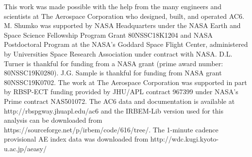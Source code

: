 \documentclass[draft]{agujournal2019}
\begin{document}
\acknowledgments
This work was made possible with the help from the many engineers and scientists at The Aerospace Corporation who designed, built, and operated AC6. M. Shumko was supported by NASA Headquarters under the NASA Earth and Space Science Fellowship Program Grant 80NSSC18K1204 and NASA Postdoctoral Program at the NASA's Goddard Space Flight Center, administered by Universities Space Research Association under contract with NASA. D.L. Turner is thankful for funding from a NASA grant (prime award number: 80NSSC19K0280). J.G. Sample is thankful for funding from NASA grant 80NSSC19K0702. The work at The Aerospace Corporation was supported in part by RBSP-ECT funding provided by JHU/APL contract 967399 under NASA's Prime contract NAS501072. The AC6 data and documentation is available at http://rbspgway.jhuapl.edu/ac6 and the IRBEM-Lib version used for this analysis can be downloaded from \\ \noindent https://sourceforge.net/p/irbem/code/616/tree/. The 1-minute cadence provisional AE index data was downloaded from http://wdc.kugi.kyoto-u.ac.jp/aeasy/

%
%
\end{document}
